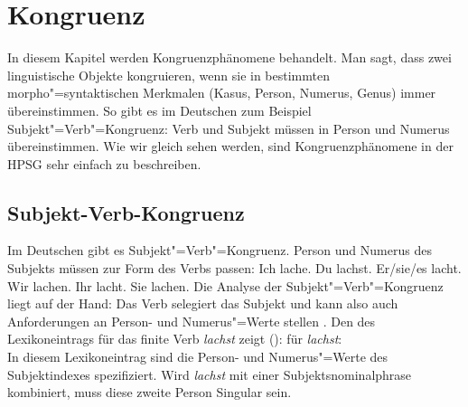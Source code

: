 

\chapter{Kongruenz}
\label{Kapitel-kongruenz}

In diesem Kapitel werden Kongruenzphänomene behandelt. Man sagt, dass zwei linguistische
Objekte kongruieren, wenn sie in bestimmten morpho"=syntaktischen Merkmalen (\zb Kasus,
Person, Numerus, Genus) immer übereinstimmen.
So gibt es im Deutschen zum Beispiel Subjekt"=Verb"=Kongruenz: 
Verb und Subjekt müssen in Person und Numerus übereinstimmen.
Wie wir gleich sehen werden, sind Kongruenzphänomene in der HPSG sehr einfach
zu beschreiben.

\section{Subjekt-Verb-Kongruenz}

Im Deutschen gibt es Subjekt"=Verb"=Kongruenz. Person und Numerus des Subjekts
müssen zur Form des Verbs passen:
\eal
\ex Ich lache.
\ex Du lachst.
\ex Er/sie/es lacht.
\ex Wir lachen.
\ex Ihr lacht.
\ex Sie lachen.
\zl
Die Analyse der Subjekt"=Verb"=Kongruenz liegt auf der Hand: Das Verb selegiert
das Subjekt und kann also auch Anforderungen an Person- und Numerus"=Werte stellen \citep[]{ps2}.
Den \localw des Lexikoneintrags für das finite Verb \emph{lachst} zeigt ():
\ea
\localw für \emph{lachst}:\\
\z
In diesem Lexikoneintrag sind die Person- und Numerus"=Werte des Subjektindexes 
spezifiziert. Wird \emph{lachst} mit einer Subjektsnominalphrase kombiniert, muss diese zweite Person Singular
sein.

